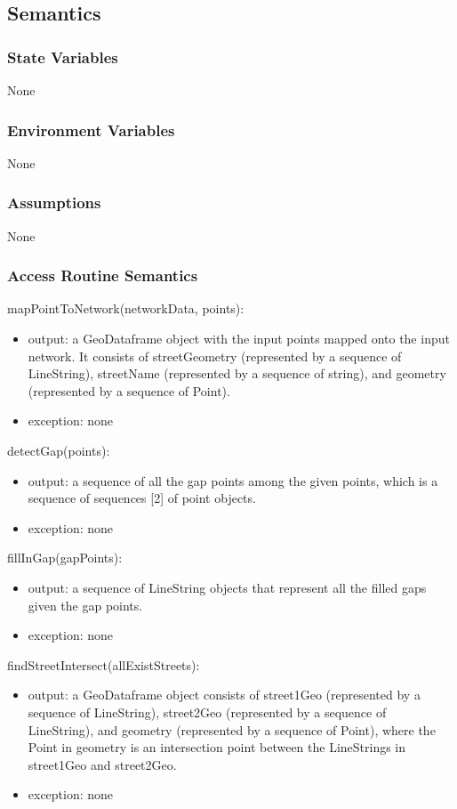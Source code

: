 \documentclass[12pt, titlepage]{article}
\begin{document}
\subsection{Semantics}

\subsubsection{State Variables}
None

\subsubsection{Environment Variables}
None

\subsubsection{Assumptions}
None

\subsubsection{Access Routine Semantics}

\noindent mapPointToNetwork(networkData, points):
\begin{itemize}
\item output: a GeoDataframe object with the input points mapped onto the input network. It consists of streetGeometry (represented by a sequence of LineString), streetName (represented by a sequence of string), and geometry (represented by a sequence of Point).
\item exception: none
\end{itemize}

\noindent detectGap(points):
\begin{itemize}
\item output: a sequence of all the gap points among the given points, which is a sequence of sequences [2] of point objects.
\item exception: none
\end{itemize}

\noindent fillInGap(gapPoints):
\begin{itemize}
\item output: a sequence of LineString objects that represent all the filled gaps given the gap points.
\item exception: none
\end{itemize}

\noindent findStreetIntersect(allExistStreets):
\begin{itemize}
\item output:  a GeoDataframe object consists of street1Geo (represented by a sequence of LineString), street2Geo (represented by a sequence of LineString), and geometry (represented by a sequence of Point), where the Point in geometry is an intersection point between the LineStrings in street1Geo and street2Geo.
\item exception: none
\end{itemize}
\end{document}
